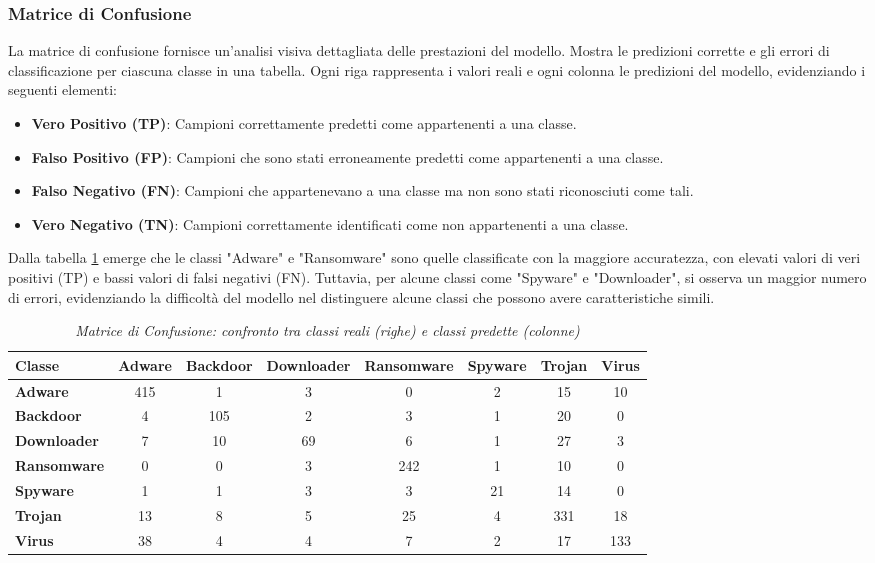     

\subsubsection{Matrice di Confusione}
La matrice di confusione fornisce un'analisi visiva dettagliata delle prestazioni del modello. Mostra le predizioni corrette e gli errori di classificazione per ciascuna classe in una tabella. Ogni riga rappresenta i valori reali e ogni colonna le predizioni del modello, evidenziando i seguenti elementi:
\begin{itemize}
    \item \textbf{Vero Positivo (TP)}: Campioni correttamente predetti come appartenenti a una classe.
    \item \textbf{Falso Positivo (FP)}: Campioni che sono stati erroneamente predetti come appartenenti a una classe.
    \item \textbf{Falso Negativo (FN)}: Campioni che appartenevano a una classe ma non sono stati riconosciuti come tali.
    \item \textbf{Vero Negativo (TN)}: Campioni correttamente identificati come non appartenenti a una classe.
\end{itemize}

Dalla tabella \ref{tab:confusion_matrix} emerge che le classi "Adware" e "Ransomware" sono quelle classificate con la maggiore accuratezza, con elevati valori di veri positivi (TP) e bassi valori di falsi negativi (FN). Tuttavia, per alcune classi come "Spyware" e "Downloader", si osserva un maggior numero di errori, evidenziando la difficoltà del modello nel distinguere alcune classi che possono avere caratteristiche simili.
\begin{table}[ht]
    \centering
    \hspace*{-2cm} 
    \begin{tabular}{@{}|l|c|c|c|c|c|c|c|@{}}
    \toprule
    \textbf{Classe}      & \textbf{Adware} & \textbf{Backdoor} & \textbf{Downloader} & \textbf{Ransomware} & \textbf{Spyware} & \textbf{Trojan} & \textbf{Virus} \\ \midrule
    \textbf{Adware}      & 415 & 1   & 3   & 0   & 2   & 15  & 10  \\\midrule
    \textbf{Backdoor}    & 4   & 105 & 2   & 3   & 1   & 20  & 0   \\\midrule
    \textbf{Downloader}  & 7   & 10  & 69  & 6   & 1   & 27  & 3   \\\midrule
    \textbf{Ransomware}  & 0   & 0   & 3   & 242 & 1   & 10  & 0   \\\midrule
    \textbf{Spyware}     & 1   & 1   & 3   & 3   & 21  & 14  & 0   \\\midrule
    \textbf{Trojan}      & 13  & 8   & 5   & 25  & 4   & 331 & 18  \\\midrule
    \textbf{Virus}       & 38  & 4   & 4   & 7   & 2   & 17  & 133 \\\bottomrule
    \end{tabular}
    \vspace{.2cm}
    \caption{\emph{Matrice di Confusione: confronto tra classi reali (righe) e classi predette (colonne)}}
    \label{tab:confusion_matrix}
\end{table}
    
